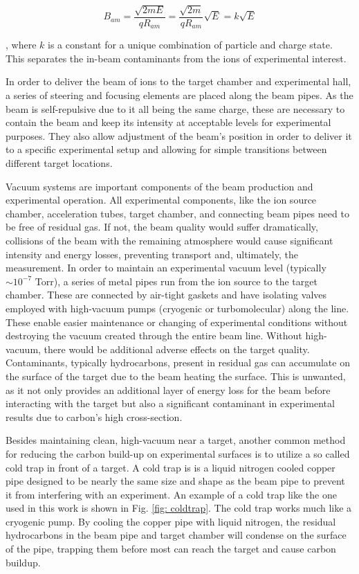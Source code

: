 \begin{equation}
B_{am} = \dfrac{\sqrt{2 m E}}{q R_{am}} = \dfrac{\sqrt{2m}}{q R_{am}} \sqrt{E} = k \sqrt{E}
\label{eqn: analyzingMagnet}
\end{equation}

\noindent, where $k$ is a constant for a unique combination of particle and charge state. This separates the in-beam contaminants from the ions of experimental interest.  

In order to deliver the beam of ions to the target chamber and experimental hall, a series of steering and focusing elements are placed along the beam pipes. As the beam is self-repulsive due to it all being the same charge, these are necessary to contain the beam and keep its intensity at acceptable levels for experimental purposes. They also allow adjustment of the beam's position in order to deliver it to a specific experimental setup and allowing for simple transitions between different target locations. 

Vacuum systems are important components of the beam production and experimental operation. All experimental components, like the ion source chamber, acceleration tubes, target chamber, and connecting beam pipes need to be free of residual gas. If not, the beam quality would suffer dramatically, collisions of the beam with the remaining atmosphere would cause significant intensity and energy losses, preventing transport and, ultimately, the measurement. In order to maintain an experimental vacuum level (typically $\sim 10^{-7}$ Torr), a series of metal pipes run from the ion source to the target chamber. These are connected by air-tight gaskets and have isolating valves employed with high-vacuum pumps (cryogenic or turbomolecular) along the line. These enable easier maintenance or changing of experimental conditions without destroying the vacuum created through the entire beam line. Without high-vacuum, there would be additional adverse effects on the target quality. Contaminants, typically hydrocarbons, present in residual gas can accumulate on the surface of the target due to the beam heating the surface. This is unwanted, as it not only provides an additional layer of energy loss for the beam before interacting with the target but also a significant contaminant in experimental results due to carbon's high cross-section.

Besides maintaining clean, high-vacuum near a target, another common method for reducing the carbon build-up on experimental surfaces is to utilize a so called cold trap in front of a target. A cold trap is is a liquid nitrogen cooled copper pipe designed to be nearly the same size and shape as the beam pipe to prevent it from interfering with an experiment. An example of a cold trap like the one used in this work is shown in Fig. \ref{fig: coldtrap}. The cold trap works much like a cryogenic pump. By cooling the copper pipe with liquid nitrogen, the residual hydrocarbons in the beam pipe and target chamber will condense on the surface of the pipe, trapping them before most can reach the target and cause carbon buildup. 


